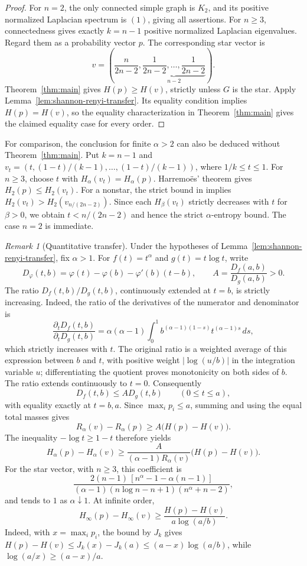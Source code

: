 \documentclass[11pt,a4paper,reqno]{amsart}
\theoremstyle{remark}
\newtheorem{remark}[theorem]{Remark}
\numberwithin{equation}{section}
\begin{document}
\begin{proof}
For $n=2$, the only connected simple graph is $K_2$, and its positive
normalized Laplacian spectrum is $(1)$, giving all assertions.
For $n\ge3$, connectedness gives exactly $k=n-1$ positive normalized
Laplacian eigenvalues. Regard them as a probability vector $p$.
The corresponding star vector is
\[
 v=\left(\frac{n}{2n-2},
         \underbrace{\frac1{2n-2},\ldots,\frac1{2n-2}}_{n-2}\right).
\]
Theorem~\ref{thm:main} gives $H(p)\ge H(v)$, strictly unless $G$ is
the star. Apply Lemma~\ref{lem:shannon-renyi-transfer}. Its equality
condition implies $H(p)=H(v)$, so the equality characterization in
Theorem~\ref{thm:main} gives the claimed equality case for every order.
\end{proof}

For comparison, the conclusion for finite $\alpha>2$ can also be
deduced without Theorem~\ref{thm:main}. Put $k=n-1$ and
$v_t=(t,(1-t)/(k-1),\ldots,(1-t)/(k-1))$, where $1/k\le t\le1$.
For $n\ge3$, choose $t$ with $H_\alpha(v_t)=H_\alpha(p)$.
Harremo\"es' theorem \cite[Theorem 3]{Harremoes2009} gives
$H_2(p)\le H_2(v_t)$. For a nonstar, the strict bound in
\cite[Theorem 3.8]{Dairyko2017} implies
$H_2(v_t)>H_2(v_{n/(2n-2)})$.
Since each $H_\beta(v_t)$ strictly decreases with $t$ for $\beta>0$,
we obtain $t<n/(2n-2)$ and hence the strict $\alpha$-entropy bound.
The case $n=2$ is immediate.

\begin{remark}[Quantitative transfer]
Under the hypotheses of Lemma~\ref{lem:shannon-renyi-transfer}, fix
$\alpha>1$. For $f(t)=t^\alpha$ and $g(t)=t\log t$, write
\[
 D_\varphi(t,b)=\varphi(t)-\varphi(b)-\varphi'(b)(t-b),\qquad
 A=\frac{D_f(a,b)}{D_g(a,b)}>0.
\]
The ratio $D_f(t,b)/D_g(t,b)$, continuously extended at $t=b$,
is strictly increasing. Indeed, the ratio of the derivatives of the
numerator and denominator is
\[
 \frac{\partial_tD_f(t,b)}{\partial_tD_g(t,b)}
 =\alpha(\alpha-1)\int_0^1
 b^{(\alpha-1)(1-s)}t^{(\alpha-1)s}\,ds,
\]
which strictly increases with $t$. The original ratio is a weighted
average of this expression between $b$ and $t$, with positive
weight $|\log(u/b)|$ in the integration variable $u$; differentiating
the quotient proves monotonicity on both sides of $b$.
The ratio extends continuously to $t=0$. Consequently
\begin{equation}\label{eq:renyi-scalar-majorant}
 D_f(t,b)\le A D_g(t,b)\qquad(0\le t\le a),
\end{equation}
with equality exactly at $t=b,a$. Since $\max_i p_i\le a$, summing
and using the equal total masses gives
\[
 R_\alpha(v)-R_\alpha(p)\ge A\bigl(H(p)-H(v)\bigr).
\]
The inequality $-\log t\ge1-t$ therefore yields
\[
 H_\alpha(p)-H_\alpha(v)
 \ge\frac{A}{(\alpha-1)R_\alpha(v)}
       \bigl(H(p)-H(v)\bigr).
\]
For the star vector, with $n\ge3$, this coefficient is
\[
 \frac{2(n-1)\,[n^\alpha-1-\alpha(n-1)]}
 {(\alpha-1)(n\log n-n+1)(n^\alpha+n-2)},
\]
and tends to $1$ as $\alpha\downarrow1$. At infinite order,
\[
 H_\infty(p)-H_\infty(v)
 \ge\frac{H(p)-H(v)}{a\log(a/b)}.
\]
Indeed, with $x=\max_i p_i$, the bound by $J_k$ gives
$H(p)-H(v)\le J_k(x)-J_k(a)\le(a-x)\log(a/b)$, while
$\log(a/x)\ge(a-x)/a$.
\end{remark}
\end{document}
